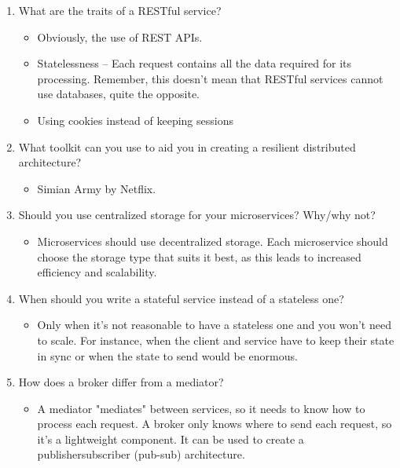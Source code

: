 \begin{enumerate}
\item
What are the traits of a RESTful service?

\begin{itemize}
\item 
Obviously, the use of REST APIs.

\item 
Statelessness – Each request contains all the data required for its processing. Remember, this doesn't mean that RESTful services cannot use databases, quite the opposite.

\item 
Using cookies instead of keeping sessions
\end{itemize}

\item
What toolkit can you use to aid you in creating a resilient distributed architecture?

\begin{itemize}
\item 
Simian Army by Netflix.
\end{itemize}

\item
Should you use centralized storage for your microservices? Why/why not?

\begin{itemize}
\item 
Microservices should use decentralized storage. Each microservice should choose the storage type that suits it best, as this leads to increased efficiency and scalability.
\end{itemize}

\item
When should you write a stateful service instead of a stateless one?

\begin{itemize}
\item 
Only when it's not reasonable to have a stateless one and you won't need to scale. For instance, when the client and service have to keep their state in sync or when the state to send would be enormous.
\end{itemize}

\item
How does a broker differ from a mediator?

\begin{itemize}
\item 
A mediator "mediates" between services, so it needs to know how to process each request. A broker only knows where to send each request, so it's a lightweight component. It can be used to create a publishersubscriber (pub-sub) architecture.
\end{itemize}


\end{enumerate}
